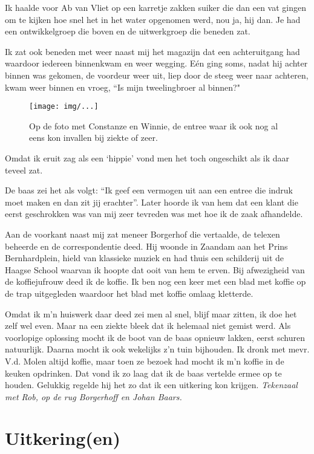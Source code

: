 \documentclass[10pt,twoside,openright]{memoir}
\begin{document}
Ik haalde voor Ab van Vliet op een karretje zakken suiker die dan een vat gingen om te kijken hoe snel het in het water opgenomen werd, nou ja, hij dan. Je had een ontwikkelgroep die boven en de uitwerkgroep die beneden zat. 

Ik zat ook beneden met weer naast mij het magazijn dat een achteruitgang had waardoor iedereen binnenkwam en weer wegging. Eén ging soms, nadat hij achter binnen was gekomen, de voordeur weer uit, liep door de steeg weer naar achteren, kwam weer binnen en vroeg, ``Is mijn tweelingbroer al binnen?"

\begin{figure}[t]
\texttt{[image: img/...]}
\caption{Op de foto met Constanze en Winnie, de entree waar ik ook nog al eens kon invallen bij ziekte of zeer.}
\end{figure}

Omdat ik eruit zag als een ‘hippie’ vond men het toch ongeschikt als ik daar teveel zat.

De baas zei het als volgt: ``Ik geef een vermogen uit aan een entree die indruk moet maken en dan zit jij erachter''. Later hoorde ik van hem dat een klant die eerst geschrokken was van mij zeer tevreden was met hoe ik de zaak afhandelde.

Aan de voorkant naast mij zat meneer Borgerhof die vertaalde, de telexen beheerde en de correspondentie deed. Hij woonde in Zaandam aan het Prins Bernhardplein, hield van klassieke muziek en had thuis een schilderij uit de Haagse School waarvan ik hoopte dat ooit van hem te erven. Bij afwezigheid van de koffiejufrouw deed ik de koffie. Ik ben nog een keer met een blad met koffie op de trap uitgegleden waardoor het blad met koffie omlaag kletterde.

Omdat ik m'n huiswerk daar deed zei men al snel, blijf maar zitten, ik doe het zelf wel even. Maar na een ziekte bleek dat ik helemaal niet gemist werd. Als voorlopige oplossing mocht ik de boot van de baas opnieuw lakken, eerst schuren natuurlijk. Daarna mocht ik ook wekelijks z’n tuin bijhouden. Ik dronk met mevr. V.d. Molen altijd koffie, maar toen ze bezoek had mocht ik m’n koffie in de keuken opdrinken. Dat vond ik zo laag dat ik de baas vertelde ermee op te houden. Gelukkig regelde hij het zo dat ik een uitkering kon krijgen. 
\emph{Tekenzaal met Rob, op de rug Borgerhoff en Johan Baars.}

\chapter{Uitkering(en)} %
\label{cha:uitkering_en}
\end{document}

